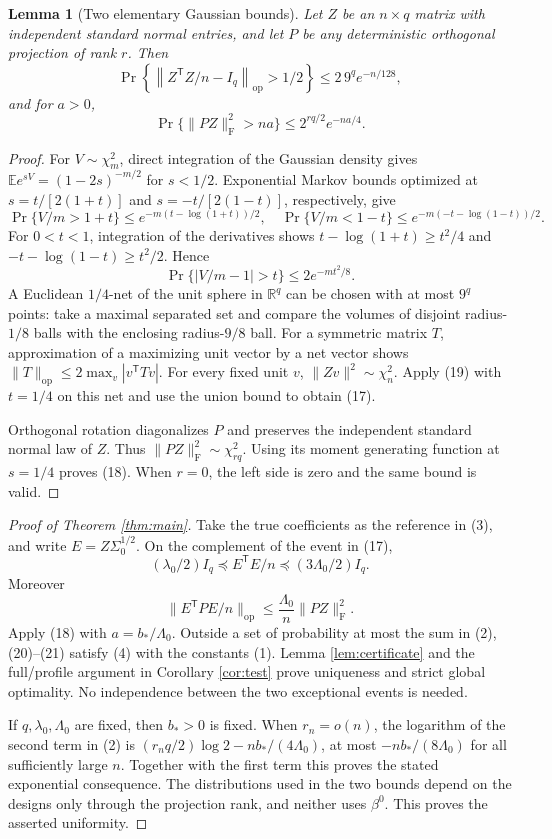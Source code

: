 \documentclass[11pt]{article}
\newtheorem{lemma}[theorem]{Lemma}
\newcommand{\op}{\mathrm{op}}
\newcommand{\F}{\mathrm{F}}
\begin{document}
\begin{lemma}[Two elementary Gaussian bounds]\label{lem:tails}
Let \(Z\) be an \(n\times q\) matrix with independent standard normal
entries, and let \(P\) be any deterministic orthogonal projection of
rank \(r\). Then
\[
 \Pr\left\{\left\|Z^{\mathsf T}Z/n-I_q\right\|_{\op}>1/2\right\}
 \leq2\,9^q e^{-n/128},
 \tag{17}
\]
and for \(a>0\),
\[
 \Pr\{\|PZ\|_{\F}^2>na\}\leq2^{rq/2}e^{-na/4}.
 \tag{18}
\]
\end{lemma}

\begin{proof}
For \(V\sim\chi^2_m\), direct integration of the Gaussian density
gives \(\mathbb E e^{sV}=(1-2s)^{-m/2}\) for \(s<1/2\).
Exponential Markov bounds optimized at
\(s=t/[2(1+t)]\) and \(s=-t/[2(1-t)]\), respectively, give
\[
 \Pr\{V/m>1+t\}\leq e^{-m(t-\log(1+t))/2},\quad
 \Pr\{V/m<1-t\}\leq e^{-m(-t-\log(1-t))/2}.
\]
For \(0<t<1\), integration of the derivatives shows
\(t-\log(1+t)\geq t^2/4\) and
\(-t-\log(1-t)\geq t^2/2\). Hence
\[
 \Pr\{|V/m-1|>t\}\leq2e^{-mt^2/8}.
 \tag{19}
\]
A Euclidean \(1/4\)-net of the unit sphere in \(\mathbb R^q\)
can be chosen with at most \(9^q\) points: take a maximal separated
set and compare the volumes of disjoint radius-\(1/8\) balls with
the enclosing radius-\(9/8\) ball. For a symmetric matrix \(T\),
approximation of a maximizing unit vector by a net vector shows
\(\|T\|_{\op}\leq2\max_v|v^{\mathsf T}Tv|\).
For every fixed unit \(v\), \(\|Zv\|^2\sim\chi_n^2\).
Apply (19) with \(t=1/4\) on this net and use the union bound
to obtain (17).

Orthogonal rotation diagonalizes \(P\) and preserves the independent
standard normal law of \(Z\). Thus \(\|PZ\|_{\F}^2\sim\chi^2_{rq}\).
Using its moment generating function at \(s=1/4\) proves (18).
When \(r=0\), the left side is zero and the same bound is valid.
\end{proof}

\begin{proof}[Proof of Theorem \ref{thm:main}]
Take the true coefficients as the reference in (3), and write
\(E=Z\Sigma_0^{1/2}\). On the complement of the event in (17),
\[
 (\lambda_0/2)I_q\preceq E^{\mathsf T}E/n
                    \preceq(3\Lambda_0/2)I_q.
 \tag{20}
\]
Moreover
\[
 \|E^{\mathsf T}PE/n\|_{\op}
 \leq\frac{\Lambda_0}{n}\|PZ\|_{\F}^2.
 \tag{21}
\]
Apply (18) with \(a=b_*/\Lambda_0\).
Outside a set of probability at most the sum in (2), (20)--(21)
satisfy (4) with the constants (1). Lemma
\ref{lem:certificate} and the full/profile argument in Corollary
\ref{cor:test} prove uniqueness and strict global optimality.
No independence between the two exceptional events is needed.

If \(q,\lambda_0,\Lambda_0\) are fixed, then \(b_*>0\) is fixed.
When \(r_n=o(n)\), the logarithm of the second term in (2) is
\((r_nq/2)\log2-nb_*/(4\Lambda_0)\), at most
\(-nb_*/(8\Lambda_0)\) for all sufficiently large \(n\).
Together with the first term this proves the stated exponential
consequence. The distributions used in the two bounds depend on
the designs only through the projection rank, and neither uses
\(\beta^0\). This proves the asserted uniformity.
\end{proof}
\end{document}

